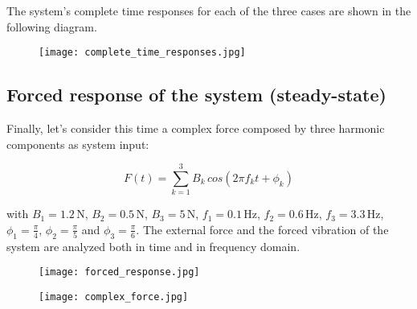 \documentclass[a4paper,12pt,oneside]{article}
\begin{document}
The system's complete time responses for each of the three cases are shown in the following diagram.

\begin{figure}[h]
	\centering
	\texttt{[image: complete\_time\_responses.jpg]}
\end{figure}

\subsection{Forced response of the system (steady-state)}

Finally, let's consider this time a complex force composed by three harmonic components as system input:

\[ F(t) = \sum_{k=1}^3 B_k \, cos(2 \pi f_k t + \phi_k) \]

with $ B_1 = 1.2 \, \text{N} $, $ B_2 = 0.5 \, \text{N} $, $ B_3 = 5 \, \text{N} $, $ f_1 = 0.1 \, \text{Hz} $, $ f_2 = 0.6 \, \text{Hz} $, $ f_3 = 3.3 \, \text{Hz} $, $ \phi_1 = \frac{\pi}{4} $, $ \phi_2 = \frac{\pi}{5} $ and $ \phi_3 = \frac{\pi}{6} $. The external force and the forced vibration of the system are analyzed both in time and in frequency domain.

\begin{figure}
	\centering
	\texttt{[image: forced\_response.jpg]}
\end{figure}

\begin{figure}
	\centering
	\texttt{[image: complex\_force.jpg]}
\end{figure}
\end{document}
